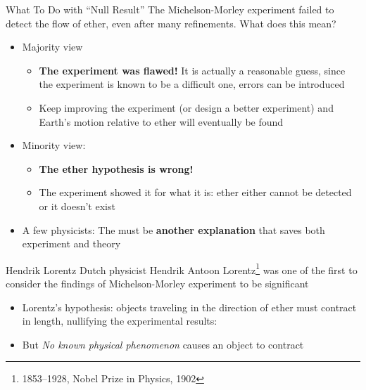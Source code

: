 \documentclass[12pt,compress,aspectratio=169]{beamer}
\newcommand{\bigsqrt}{\ensuremath\sqrt{1-\left(\frac{v}{c}\right)^2}}
\begin{document}
\begin{frame}{What To Do with ``Null Result''}
  The Michelson-Morley experiment failed to detect the flow of ether, even
  after many refinements. What does this mean?
  \begin{itemize}
  \item Majority view
    \begin{itemize}
    \item\textbf{The experiment was flawed!} It is actually a reasonable
      guess, since the experiment is known to be a difficult one, errors can
      be introduced
    \item Keep improving the experiment (or design a better experiment) and
      Earth's motion relative to ether will eventually be found
    \end{itemize}
  \item Minority view:
    \begin{itemize}
    \item\textbf{The ether hypothesis is wrong!}
    \item The experiment showed it for what it is: ether either cannot be
      detected or it doesn't exist
    \end{itemize}
  \item A few physicists: The must be \textbf{another explanation} that saves
    both experiment and theory
  \end{itemize}
\end{frame}



\begin{frame}{Hendrik Lorentz}
  Dutch physicist Hendrik Antoon Lorentz\footnote{1853--1928, Nobel Prize in
    Physics, 1902} was one of the first to consider the findings of
  Michelson-Morley experiment to be significant
  \begin{itemize}
  \item Lorentz's hypothesis: objects traveling in the direction of ether must
    contract in length, nullifying the experimental results:

    \eq{-.2in}{
      \boxed{\beta=\bigsqrt}
    }
  \item But \emph{No known physical phenomenon} causes an object to contract
  \end{itemize}
\end{frame}
\end{document}
